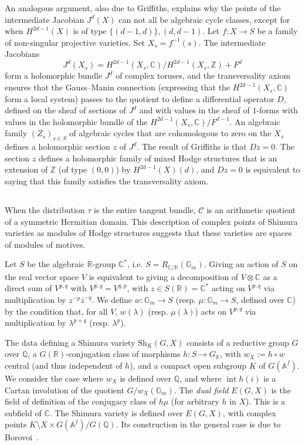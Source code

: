 \documentclass{article}
\theoremstyle{plain}
\theoremstyle{definition}
\newcommand{\ZZ}{\mathbb{Z}}
\newcommand{\QQ}{\mathbb{Q}}
\newcommand{\CC}{\mathbb{C}}
\newcommand{\RR}{\mathbb{R}}
\renewcommand{\AA}{\mathbb{A}}
\newcommand{\GG}{\mathbb{G}}
\newcommand{\oldpage}[1]{\marginpar{\footnotesize$\Big\vert$ \textit{p.~#1}}}
\begin{document}
An analogous argument, also due to Griffiths, explains why the points of the intermediate Jacobian $J^d(X)$ can not all be algebraic cycle classes, except for when $H^{2d-1}(X)$ is of type $\{(d-1,d)\},(d,d-1)$.
Let $f\colon X\to S$ be a family of non-singular projective varieties.
Set $X_s=f^{-1}(s)$.
The intermediate Jacobians
\[
  J^d(X_s) = H^{2d-1}(X_s,\CC)/H^{2d-1}(X_s,\ZZ) + F^d
\]
form a holomorphic bundle $J^d$ of complex toruses, and the transversality axiom ensures that the Gauss--Manin connection (expressing that the $H^{2d-1}(X_s,\CC)$ form a local system) passes to the quotient to define a differential operator $D$, defined on the sheaf of sections of $J^d$ and with values in the sheaf of $1$-forms with values in the holomorphic bundle of the $H^{2d-1}(X_s,\CC)/F^{d-1}$.
An algebraic family $(Z_s)_{s\in S}$ of algebraic cycles that are cohomologous to zero on the $X_s$ defines a holomorphic section $z$ of $J^d$.
The result of Griffiths is that $Dz=0$.
The section $z$ defines a holomorphic family of mixed Hodge structures that is an extension of $\ZZ$ (of type $(0,0)$) by $H^{2d-1}(X)(d)$, and $Dz=0$ is equivalent to saying that this family satisfies the transversality axiom.


\subsection{}
\label{1.7}

When the distribution $\tau$ is the entire tangent bundle, $\mathscr{C}$ is an arithmetic quotient of a symmetric Hermitian domain.
This description of complex points of Shimura varieties as modules of Hodge structures suggests that these varieties are spaces of modules of motives.

\oldpage{150}
Let $S$ be the algebraic $\RR$-group $\CC^*$, i.e. $S=R_{\CC/\RR}(\GG_m)$.
Giving an action of $S$ on the real vector space $V$ is equivalent to giving a decomposition of $V\otimes\CC$ as a direct sum of $V^{p,q}$ with $\overline{V^{p,q}}=V^{q,p}$, with $z\in S(\RR)=\CC^*$ acting on $V^{p,q}$ via multiplication by $z^{-p}\overline{z}^{-q}$.
We define $w\colon\GG_m\to S$ (resp. $\mu\colon\GG_m\to S$, defined over $\CC$) by the condition that, for all $V$, $w(\lambda)$ (resp. $\mu(\lambda)$) acts on $V^{p,q}$ via multiplication by $\lambda^{p+q}$ (resp. $\lambda^p$).

The data defining a Shimura variety $\mathrm{Sh}_K(G,X)$ consists of a reductive group $G$ over $\QQ$, a $G(\RR)$-conjugation class of morphisms $h\colon S\to G_\RR$, with $w_X:= h\circ w$ central (and thus independent of $h$), and a compact open subgroup $K$ of $G(\AA^f)$.
We consider the case where $w_X$ is defined over $\QQ$, and where $\operatorname{int}h(i)$ is a Cartan involution of the quotient $G/w_X(\GG_m)$.
The \emph{dual field} $E(G,X)$ is the field of definition of the conjugacy class of $h\mu$ (for arbitrary $h$ in $X$).
This is a subfield of $\CC$.
The Shimura variety is defined over $E(G,X)$, with complex points $K\setminus X\times G(\AA^f)/G(\QQ)$.
Its construction in the general case is due to Borovoi~\cite{6}.
\end{document}
